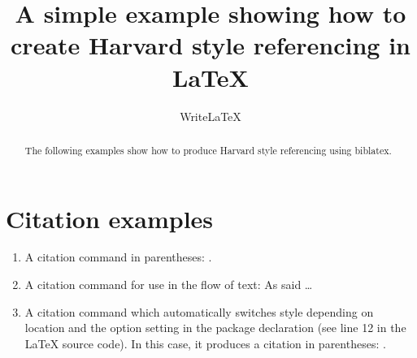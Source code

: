 \documentclass[a4paper]{article}
\title{A simple example showing how to create Harvard style referencing in LaTeX}
\author{WriteLaTeX}
\date{}
\begin{document}
\maketitle

\begin{abstract}
The following examples show how to produce Harvard style referencing using biblatex.
\end{abstract}

\section*{Citation examples}

\begin{enumerate}
\item A citation command in parentheses: \parencite{Smith:2012qr}.
\item A citation command for use in the flow of text: As \textcite{Smith:2013jd} said \dots
\item A citation command which automatically switches style depending on location and the option setting in the package declaration (see line 12 in the LaTeX source code). In this case, it produces a citation in parentheses: \autocite{Other:2014ab}.
\end{enumerate}

\printbibliography
\end{document}
